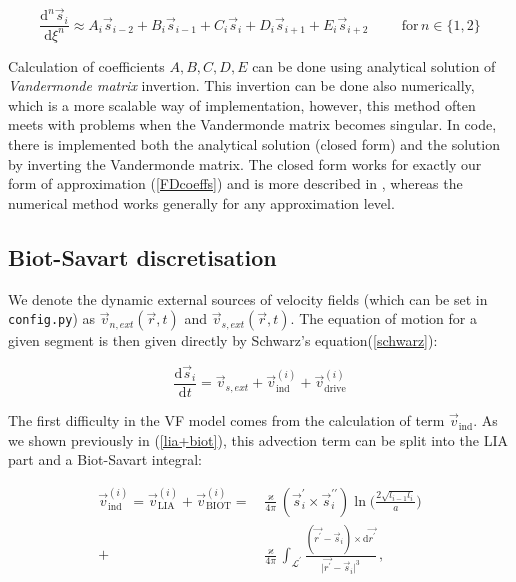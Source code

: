 \begin{equation}
\frac{\text{d}^n\vec{s}_i}{\text{d}\xi^n} \approx
A_i\vec{s}_{i-2} +
B_i\vec{s}_{i-1} +
C_i\vec{s}_{i} +
D_i\vec{s}_{i+1} +
E_i\vec{s}_{i+2}
\hspace{1cm}
\text{for} \,n\in\{1,2\}
\label{FDcoeffs}
\end{equation}

Calculation of coefficients $A, B, C, D, E$ can be done using analytical solution of \textit{Vandermonde matrix} invertion. This invertion can be done also numerically, which is a more scalable way of implementation, however, this method often meets with problems when the Vandermonde matrix becomes singular.
In code, there is implemented both the analytical solution (closed form) and the solution by inverting the Vandermonde matrix. The closed form works for exactly our form of approximation (\ref{FDcoeffs}) and is more described in \cite{FDclosed}, whereas the numerical method works generally for any approximation level.

\subsection*{Biot-Savart discretisation}

We denote the dynamic external sources of velocity fields (which can be set in \texttt{config.py}) as $\vec{v}_{n,ext}(\vec{r}, t)$ and $\vec{v}_{s,ext} (\vec{r}, t)$. The equation of motion for a given segment is then given directly by Schwarz's equation(\ref{schwarz}):

\begin{equation}
\frac{\text{d}\vec{s}_i}{\text{d}t} =
\vec{v}_{s,ext} + \vec{v}_{\text{ind}}^{(i)} + \vec{v}_{\text{drive}}^{(i)}
\end{equation}

The first difficulty in the VF model comes from the calculation of term $\vec{v}_{\text{ind}}$. As we shown previously in (\ref{lia+biot}), this advection term can be split into the LIA part and a Biot-Savart integral:

\begin{align}
\vec{v}_{\text{ind}}^{(i)} =
\vec{v}_{\text{LIA}}^{(i)} + \vec{v}_{\text{BIOT}}^{(i)} =&
\frac{\varkappa}{4\pi} (\vec{s}^{\prime}_i \times \vec{s}^{\prime \prime}_i)
\ln{\Bigg(\frac{2\sqrt{l_{i-1} l_i}}{a}\Bigg)}
\label{LIA}
\\
+& \frac{\varkappa}{4\pi} \int_{\mathcal{L}^{\prime}} \frac{(\vec{r^{\prime}} - \vec{s}_i) \times \text{d}\vec{r^{\prime}}}{\vert \vec{r^{\prime}} - \vec{s}_i \vert^3}\,,
\label{BIOT}
\end{align}

